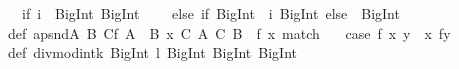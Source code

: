 \begin{isabellebody}
\begin{isamarkuptext}
\ \ {}if\ {}i\ {}{}\ BigInt{}{}{}{}\ BigInt{}{}{}\isanewline
\ \ \ \ else\ {}if\ {}BigInt{}{}{}\ {}\ i{}\ BigInt{}{}{}\ else\ {}{}\ BigInt{}{}{}{}{}{}\isanewline
\isanewline
def\ apsnd{}A{}\ B{}\ C{}{}f{}\ A\ {}{}\ B{}\ x{}{}\ {}C{}\ A{}{}{}\ {}C{}\ B{}\ {}\ {}f{}\ x{}{}\ match\ {}\isanewline
\ \ case\ {}f{}\ {}x{}\ y{}{}\ {}{}\ {}x{}\ f{}y{}{}\isanewline
{}\isanewline
\isanewline
def\ divmod{}int{}k{}\ BigInt{}\ l{}\ BigInt{}{}\ {}BigInt{}\ BigInt{}\ {}\isanewline

\end{isamarkuptext}
\end{isabellebody}
